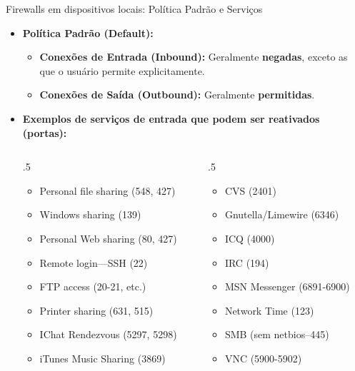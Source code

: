 \begin{frame}{Firewalls em dispositivos locais: Política Padrão e Serviços}
    \begin{itemize}
        \item \textbf{Política Padrão (Default):}
              \begin{itemize}
                  \item \textbf{Conexões de Entrada (Inbound):} Geralmente \textbf{negadas}, exceto as que o usuário permite explicitamente.
                  \item \textbf{Conexões de Saída (Outbound):} Geralmente \textbf{permitidas}.
              \end{itemize}

        \item \textbf{Exemplos de serviços de entrada que podem ser reativados (portas):}
              \begin{columns}[T] %
                  \begin{column}{.5\textwidth}
                      \begin{itemize}
                          \item Personal file sharing (548, 427)
                          \item Windows sharing (139)
                          \item Personal Web sharing (80, 427)
                          \item Remote login—SSH (22)
                          \item FTP access (20-21, etc.)
                          \item Printer sharing (631, 515)
                          \item IChat Rendezvous (5297, 5298)
                          \item iTunes Music Sharing (3869)
                      \end{itemize}
                  \end{column}
                  \begin{column}{.5\textwidth}
                      \begin{itemize}
                          \item CVS (2401)
                          \item Gnutella/Limewire (6346)
                          \item ICQ (4000)
                          \item IRC (194)
                          \item MSN Messenger (6891-6900)
                          \item Network Time (123)
                          \item SMB (sem netbios–445)
                          \item VNC (5900-5902)
                      \end{itemize}
                  \end{column}
              \end{columns}
    \end{itemize}
\end{frame}

